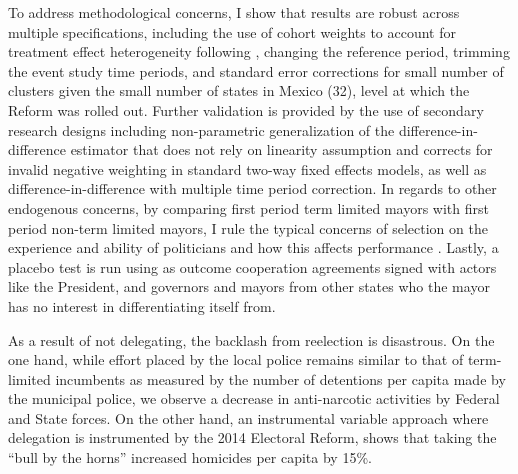 \documentclass[12pt]{amsart}
\numberwithin{equation}{section}
\theoremstyle{definition}
\theoremstyle{definition}
\theoremstyle{definition}
\begin{document}
       
To address methodological concerns, I show that results are robust across multiple specifications, including the use of cohort weights to account for treatment effect heterogeneity following \citet{abraham_sun_2020}, changing the reference period, trimming the event study time periods, and standard error corrections for small number of clusters given the small number of states in Mexico (32), level at which the Reform was rolled out. Further validation is provided by the use of secondary research designs including \citet{imai_etal_2020} non-parametric generalization of the difference-in-difference estimator that does not rely on linearity assumption and corrects for invalid negative weighting in standard two-way fixed effects models, as well as \citet{chaisemarting_etal_2019} difference-in-difference with multiple time period correction. In regards to other endogenous concerns, by comparing first period term limited mayors with first period non-term limited mayors, I rule the typical concerns of selection on the experience and ability of politicians \citep{samuelson_1984, dalbo_etal_2017} and how this affects performance \citep{ferraz_finan_2011}. Lastly, a placebo test is run using as outcome cooperation agreements signed with actors like the President, and governors and mayors from other states who the mayor has no interest in differentiating itself from.%



As a result of not delegating, the backlash from reelection is disastrous. On the one hand, while effort placed by the local police remains similar to that of term-limited incumbents as measured by the number of detentions per capita made by the municipal police, we observe a decrease in anti-narcotic activities by Federal and State forces. On the other hand, an instrumental variable approach where delegation is instrumented by the 2014 Electoral Reform, shows that taking the ``bull by the horns'' increased homicides per capita by 15\%. 
\end{document}
